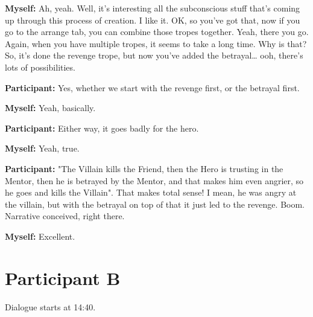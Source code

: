 \documentclass[11pt]{report}
\begin{document}
\begin{linenumbers}
\textbf{Myself:} Ah, yeah. Well, it's interesting all the subconscious stuff that's coming up through this process of creation. I like it. OK, so you've got that, now if you go to the arrange tab, you can combine those tropes together. Yeah, there you go. Again, when you have multiple tropes, it seems to take a long time. Why is that? So, it's done the revenge trope, but now you've added the betrayal\ldots{} ooh, there's lots of possibilities.

\textbf{Participant:} Yes, whether we start with the revenge first, or the betrayal first.

\textbf{Myself:} Yeah, basically.

\textbf{Participant:} Either way, it goes badly for the hero.

\textbf{Myself:} Yeah, true.

\textbf{Participant:} "The Villain kills the Friend, then the Hero is trusting in the Mentor, then he is betrayed by the Mentor, and that makes him even angrier, so he goes and kills the Villain". That makes total sense! I mean, he was angry at the villain, but with the betrayal on top of that it just led to the revenge. Boom. Narrative conceived, right there.

\textbf{Myself:} Excellent.


\end{linenumbers}
\resetlinenumber[1]
\section{Participant B}

Dialogue starts at 14:40.
\end{document}
